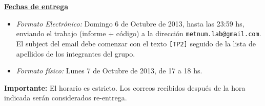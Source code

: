{\bf \underline{Fechas de entrega}}
\begin{itemize}
 \item \emph{Formato Electr\'onico:} Domingo 6 de Octubre de 2013, hasta las 23:59 hs, enviando el trabajo (informe +
 c\'odigo) a la direcci\'on \verb+metnum.lab@gmail.com+. El subject del email debe comenzar con el texto \verb+[TP2]+
 seguido de la lista de apellidos  de los integrantes del grupo.
 \item \emph{Formato f\'isico:} Lunes 7 de Octubre de 2013, de 17 a 18 hs.
\end{itemize}

\noindent \textbf{Importante:} El horario es estricto. Los correos recibidos despu\'es de la hora indicada ser\'an considerados re-entrega.  

\begin{comment}
\newpage

\textbf{Resoluci\'on}

El primer item importante de la resolucion del sistema es el modelado. Para eso, tienen primero que analizar como se
descomponen las fuerzas correspondientes a links diagonales depndiendo de la ecuaci\'on en cuesti\'on. Una vez que
tienen eso, deben decidir como numerar los links/juntas para que el armado del sistema les quede banda. Una numeraci\'on
correlativa de izquierda a derecha deberia llevarlos a un sistema con una estructura similar al que se muestra en la
Figura \ref{fig:matrixspy}, que corresponde a un caso en particular. Los puntos azules son elementos distintos de cero
de la matriz que estan fuera de la diagonal, los rojos aquellos que estan en la diagonal, y finalmente los verdes
posiciones de la diagonal de la matriz que son cero. 

\begin{figure}[!ht]
\begin{center}
\texttt{[image: matrixspy.jpg]}
\caption{Estructura de la matriz.}
\label{fig:matrixspy}
\end{center}
\end{figure}

Respecto de la resoluci\'on del sistema, se sugiere utilizar Eliminaci\'on Gaussiana con pivoteo parcial ya que (despues
de pensarlo un rato) no se me ocurrio una forma de garantizar que esto no es necesario. Es posible que exista alg\'un
ordenamiento que, combinado con alg\'un otro resultado, permita concluir que no es necesario pivotear. En este caso, si
efectivamente alg\'un grupo puede justificar esto, la idea ser\'a tomar como v\'alido que utilicen directamente
Eliminaci\'on Gaussiana standard. 


\end{comment}

